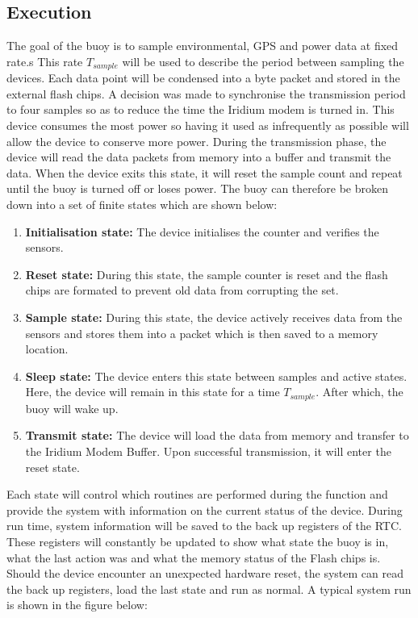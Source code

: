 \subsection{Execution}

The goal of the buoy is to sample environmental, GPS and power data at fixed rate.s This rate $T_{sample}$ will be used to describe the period between sampling the devices. Each data point will be condensed into a byte packet and stored in the external flash chips. A decision was made to synchronise the transmission period to four samples so as to reduce the time the Iridium modem is turned in. This device consumes the most power so having it used as infrequently as possible will allow the device to conserve more power. During the transmission phase, the device will read the data packets from memory into a buffer and transmit the data. When the device exits this state, it will reset the sample count and repeat until the buoy is turned off or loses power. The buoy can therefore be broken down into a set of finite states which are shown below:

\begin{enumerate}
	\item \textbf{Initialisation state:} The device initialises the counter and verifies the sensors.
	\item \textbf{Reset state:} During this state, the sample counter is reset and the flash chips are formated to prevent old data from corrupting the set.
	\item \textbf{Sample state:} During this state, the device actively receives data from the sensors and stores them into a packet which is then saved to a memory location.
	\item \textbf{Sleep state:} The device enters this state between samples and active states. Here, the device will remain in this state for a time $T_{sample}$. After which, the buoy will wake up.
	\item \textbf{Transmit state:} The device will load the data from memory and transfer to the Iridium Modem Buffer. Upon successful transmission, it will enter the reset state.
\end{enumerate}

Each state will control which routines are performed during the function and provide the system with information on the current status of the device. During run time, system information will be saved to the back up registers of the RTC. These registers will constantly be updated to show what state the buoy is in, what the last action was and what the memory status of the Flash chips is. Should the device encounter an unexpected hardware reset, the system can read the back up registers, load the last state and run as normal. A typical system run is shown in the figure below:


